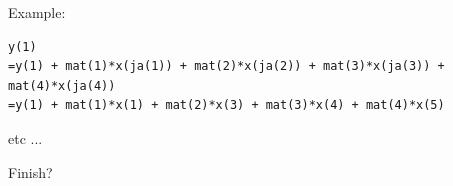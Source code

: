 Example:

\begin{verbatim}
y(1)
=y(1) + mat(1)*x(ja(1)) + mat(2)*x(ja(2)) + mat(3)*x(ja(3)) + mat(4)*x(ja(4)) 
=y(1) + mat(1)*x(1) + mat(2)*x(3) + mat(3)*x(4) + mat(4)*x(5) 
\end{verbatim}
etc ...

Finish?

 





